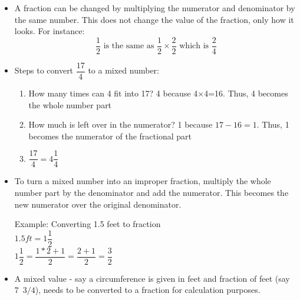\begin{itemize}
\item A fraction can be changed by multiplying the numerator and denominator by the same number. This does not change the value of the fraction, only how it looks. For instance:
$$
\dfrac{1}{2} \text { is the same as } \dfrac{1}{2} \times \dfrac{2}{2} \text { which is } \dfrac{2}{4}
$$

\item Steps to convert $\dfrac{17}{4}$ to a mixed number:
\begin{enumerate}[Step 1.]
\item How many times can 4 fit into 17? 4 because 4×4=16.  Thus, 4 becomes the whole number part
\item How much is left over in the numerator? 1 because $17-16=1$.  Thus, 1 becomes the numerator of the fractional part
\item $\dfrac{17}{4} = 4\dfrac{1}{4}$
\end{enumerate}
\vspace{0.2cm}
\item To turn a mixed number into an improper fraction, multiply the whole number part by the denominator and add the numerator. This becomes the new numerator over the original denominator.

Example: Converting 1.5 feet to fraction\\
$1.5ft=1\dfrac{1}{2}$\\
\vspace{0.2cm}
$1\dfrac{1}{2}=\dfrac{1*2+1}{2}=\dfrac{2+1}{2}=\dfrac{3}{2}$
\vspace{0.2cm}
\item A mixed value - say a circumference is given in feet and fraction of feet (say $7 \enspace 3/4$), needs to be converted to a fraction for calculation purposes.
\end{itemize}




